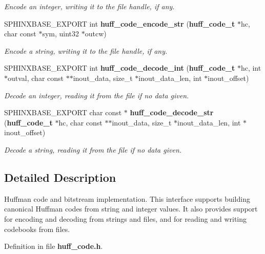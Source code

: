 \begin{DoxyCompactItemize}
\begin{DoxyCompactList}\small\item\em \-Encode an integer, writing it to the file handle, if any. \end{DoxyCompactList}\item 
\-S\-P\-H\-I\-N\-X\-B\-A\-S\-E\-\_\-\-E\-X\-P\-O\-R\-T int {\bf huff\-\_\-code\-\_\-encode\-\_\-str} ({\bf huff\-\_\-code\-\_\-t} $\ast$hc, char const $\ast$sym, uint32 $\ast$outcw)\label{huff__code_8h_a24fe76f501a7a0485f3e9485c60fae32}

\begin{DoxyCompactList}\small\item\em \-Encode a string, writing it to the file handle, if any. \end{DoxyCompactList}\item 
\-S\-P\-H\-I\-N\-X\-B\-A\-S\-E\-\_\-\-E\-X\-P\-O\-R\-T int {\bf huff\-\_\-code\-\_\-decode\-\_\-int} ({\bf huff\-\_\-code\-\_\-t} $\ast$hc, int $\ast$outval, char const $\ast$$\ast$inout\-\_\-data, size\-\_\-t $\ast$inout\-\_\-data\-\_\-len, int $\ast$inout\-\_\-offset)\label{huff__code_8h_a9155dd07a0a24393ef0e4e66cb314140}

\begin{DoxyCompactList}\small\item\em \-Decode an integer, reading it from the file if no data given. \end{DoxyCompactList}\item 
\-S\-P\-H\-I\-N\-X\-B\-A\-S\-E\-\_\-\-E\-X\-P\-O\-R\-T char const $\ast$ {\bf huff\-\_\-code\-\_\-decode\-\_\-str} ({\bf huff\-\_\-code\-\_\-t} $\ast$hc, char const $\ast$$\ast$inout\-\_\-data, size\-\_\-t $\ast$inout\-\_\-data\-\_\-len, int $\ast$inout\-\_\-offset)\label{huff__code_8h_aec0908ece3a695f8a3f6619d8d726e57}

\begin{DoxyCompactList}\small\item\em \-Decode a string, reading it from the file if no data given. \end{DoxyCompactList}\end{DoxyCompactItemize}


\subsection{\-Detailed \-Description}
\-Huffman code and bitstream implementation. \-This interface supports building canonical \-Huffman codes from string and integer values. \-It also provides support for encoding and decoding from strings and files, and for reading and writing codebooks from files. 

\-Definition in file {\bf huff\-\_\-code.\-h}.


